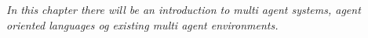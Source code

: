 \textit{In this chapter there will be an introduction to multi agent systems, agent oriented languages og existing multi agent environments.}